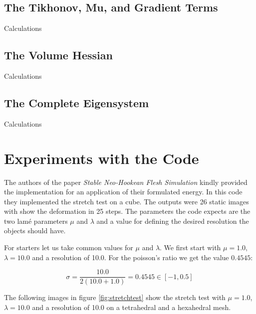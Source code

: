 \subsection{The Tikhonov, Mu, and Gradient Terms}
Calculations

\subsection{The Volume Hessian}
Calculations
 
\subsection{The Complete Eigensystem}
Calculations

\section{Experiments with the Code}
The authors of the paper \textit{Stable Neo-Hookean Flesh Simulation} \cite{Smith:2018:SNF:3191713.3180491} kindly provided the implementation for an application of their formulated energy. In this code they implemented the stretch test on a cube. The outputs were 26 static images with show the deformation in 25 steps. The parameters the code expects are the two lamé parameters $\mu$ and $\lambda$ and a value for defining the desired resolution the objects should have.


For starters let us take common values for $\mu$ and $\lambda$. We first start with $\mu = 1.0$, $\lambda = 10.0$ and a resolution of 10.0. For the poisson's ratio we get the value $0.4545$:

\[ \sigma =  \frac{10.0}{2 (10.0 + 1.0)} = 0.4545 \in [-1, 0.5] \]


The following images in figure \ref{fig:stretchtest} show the stretch test with $\mu = 1.0$, $\lambda = 10.0$ and a resolution of 10.0 on a tetrahedral and a hexahedral mesh.

